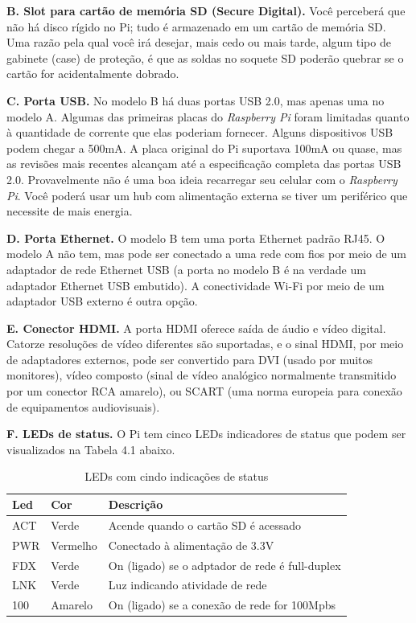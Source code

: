 \textbf{B. Slot para cartão de memória SD (Secure Digital).} Você perceberá que não há disco rígido no Pi; tudo é armazenado em um cartão de memória SD. Uma razão pela qual você irá desejar, mais cedo ou mais tarde, algum tipo de gabinete (case) de proteção, é que as soldas no soquete SD poderão quebrar se o cartão for acidentalmente dobrado.

\textbf{C. Porta USB.} No modelo B há duas portas USB 2.0, mas apenas uma no modelo A. Algumas das primeiras placas do \textit{Raspberry Pi} foram limitadas quanto à quantidade de corrente que elas poderiam fornecer. Alguns dispositivos USB podem chegar a 500mA. A placa original do Pi suportava 100mA ou quase, mas as revisões mais recentes alcançam até a especificação completa das portas USB 2.0. Provavelmente não é uma boa ideia recarregar seu celular com o \textit{Raspberry Pi}. Você poderá usar um hub com alimentação externa se tiver um periférico que necessite de mais energia.

\textbf{D. Porta Ethernet.} O modelo B tem uma porta Ethernet padrão RJ45. O modelo A não tem, mas pode ser conectado a uma rede com fios por meio de um adaptador de rede Ethernet USB (a porta no modelo B é na verdade um adaptador Ethernet USB embutido). A conectividade Wi-Fi por meio de um adaptador USB externo é outra opção.

\textbf{E. Conector HDMI.} A porta HDMI oferece saída de áudio e vídeo digital. Catorze resoluções de vídeo diferentes são suportadas, e o sinal HDMI, por meio de adaptadores externos, pode ser convertido para DVI (usado por muitos monitores), vídeo composto (sinal de vídeo analógico normalmente transmitido por um conector RCA amarelo), ou SCART (uma norma europeia para conexão de equipamentos audiovisuais).

\textbf{F. LEDs de status.} O Pi tem cinco LEDs indicadores de status que podem ser visualizados na Tabela 4.1 abaixo.

\begin{table}[!htpb]
 \centering
    \begin{tabular}{|l|p{2cm}|l|} 
    \hline
        \textbf{Led} & \textbf{Cor} & \textbf{Descrição} \\
    \hline
        ACT & Verde & Acende quando o cartão SD é acessado \\
    \hline
        PWR & Vermelho & Conectado à alimentação de 3.3V \\
    \hline
        FDX & Verde & On (ligado) se o adptador de rede é full-duplex \\
    \hline
        LNK & Verde & Luz indicando atividade de rede \\
    \hline
        100 & Amarelo & On (ligado) se a conexão de rede for 100Mpbs \\
    \hline
    \end{tabular}
    \caption{LEDs com cindo indicações de status}
    \label{t_fixa}
\end{table}

